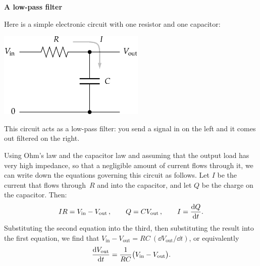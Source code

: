\documentclass[12pt]{article}
\begin{document}
\par
\bigskip
{}\par
\noindent\hrulefill


\begin{exercises}


\exercise \textbf{A low-pass filter}

\exskip Here is a simple electronic circuit
with one resistor and one capacitor:
\smallskip
\begin{center}
\includegraphics[width=7cm]{lowpass.eps}
\end{center}
\smallskip
This circuit acts as a low-pass filter: you send a signal in on the left
and it comes out filtered on the right.

Using Ohm's law and the capacitor law and assuming that the output load has
very high impedance, so that a negligible amount of current flows through
it, we can write down the equations governing this circuit as follows.  Let
$I$ be the current that flows through~$R$ and into the capacitor, and let
$Q$ be the charge on the capacitor.  Then:
\begin{displaymath}
IR = V_\textrm{in} - V_\textrm{out}\,,\qquad
 Q = CV_\textrm{out}\,,\qquad
 I = {\mathrm{d} Q\over\mathrm{d} t}.
\end{displaymath}
Substituting the second equation into the third, then substituting the
result into the first equation, we find that $V_\textrm{in} -
V_\textrm{out} = RC\>({\dd V_\textrm{out}/\dd t})$, or equivalently
\begin{displaymath}
{\mathrm{d}V_\textrm{out}\over\mathrm{d}t} = {1\over RC}
                               \bigl( V_\textrm{in} - V_\textrm{out} \bigr).
\end{displaymath}


\end{exercises}
\end{document}
